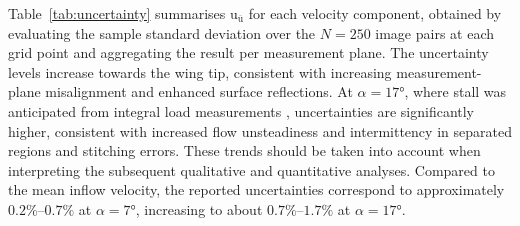 \documentclass[wes, manuscript]{copernicus}
\begin{document}
Table~\ref{tab:uncertainty} summarises $\textrm{u}_{\overline{\textrm{u}}}$ for each velocity component, obtained by evaluating the sample standard deviation over the $N=250$ image pairs at each grid point and aggregating the result per measurement plane. The uncertainty levels increase towards the wing tip, consistent with increasing measurement-plane misalignment and enhanced surface reflections. At $\alpha = 17\unit{\degree}$, where stall was anticipated from integral load measurements \citep{Poland2026a}, uncertainties are significantly higher, consistent with increased flow unsteadiness and intermittency in separated regions and stitching errors. 
These trends should be taken into account when interpreting the subsequent qualitative and quantitative analyses. Compared to the mean inflow velocity, the reported uncertainties correspond to approximately $0.2\%$--$0.7\%$ at $\alpha = 7\unit{\degree}$, increasing to about $0.7\%$--$1.7\%$ at $\alpha = 17\unit{\degree}$.
\end{document}
